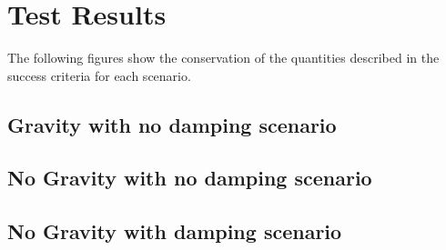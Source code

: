 \section{Test Results}

The following figures show the conservation of the quantities described in the success criteria for each scenario. 
\subsection{Gravity with no damping scenario}




\clearpage

\subsection{No Gravity with no damping scenario}






\clearpage

\subsection{No Gravity with damping scenario}





\clearpage

